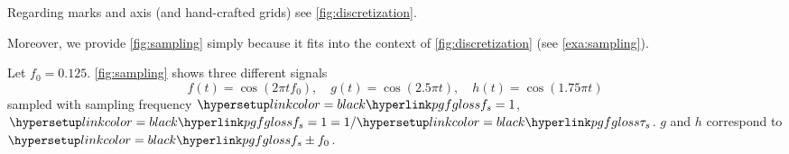 \begin{figure*}[h]
	\centering
	
	\caption{... and a legend.}
	\label{fig:simplepgfexample6}
\end{figure*}



Regarding marks and axis (and hand-crafted grids) see \cref{fig:discretization}.

\begin{figure*}
	\centering
	
	\caption{A visual overview about all pairings of discretization in time (sampling) and value (quantization, by slight abuse of floor-notation).}\label{fig:discretization}
\end{figure*}


Moreover, we provide \cref{fig:sampling} simply because it fits into the context of \cref{fig:discretization} (see \cref{exa:sampling}).


\begin{myexample}[Aliasing]\label{exa:sampling}
	Let $f_0 = 0.125$. \cref{fig:sampling} shows three different signals
	\[
	\displaystyle f(t) = \cos(2\pi t f_0),\quad
	g(t) = \cos(2.5\pi t),\quad
	h(t) = \cos(1.75\pi t)
	\]
	 sampled with sampling frequency \(\samplingfreq=1\), \ie \(\samplingfreq = 1 = {1}/\sampletime\). $g$ and $h$ correspond to $\samplingfreq \pm f_0$.
\end{myexample}

\begin{figure*}
	\centering
	
	\caption{\Cf \cref{exa:sampling}.}\label{fig:sampling}
\end{figure*}
